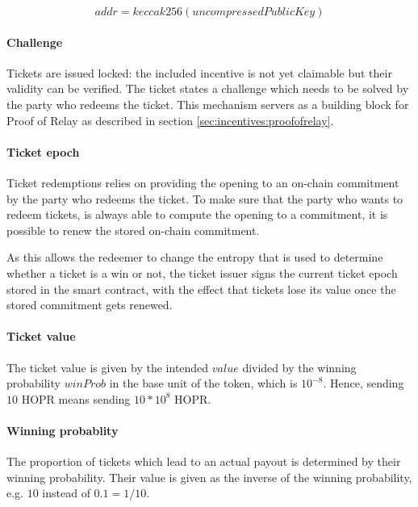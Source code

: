 $$ addr = keccak256( uncompressedPublicKey)$$

\paragraph{Challenge}
\label{sec:tickets:issuance:challenge}

Tickets are issued locked: the included incentive is not yet claimable but their validity can be verified. The ticket states a challenge which needs to be solved by the party who redeems the ticket. This mechanism servers as a building block for Proof of Relay as described in section \ref{sec:incentives:proofofrelay}.

\paragraph{Ticket epoch}
\label{sec:tickets:issuance:ticketepoch}

Ticket redemptions relies on providing the opening to an on-chain commitment by the party who redeems the ticket. To make sure that the party who wants to redeem tickets, is always able to compute the opening to a commitment, it is possible to renew the stored on-chain commitment.

As this allows the redeemer to change the entropy that is used to determine whether a ticket is a win or not, the ticket issuer signs the current ticket epoch stored in the smart contract, with the effect that tickets lose its value once the stored commitment gets renewed.

\paragraph{Ticket value}
\label{sec:tickets:issuance:ticketvalue}

The ticket value is given by the intended $value$ divided by the winning probability $winProb$ in the base unit of the token, which is $10^{-8}$. Hence, sending $10$ HOPR means sending $10 * 10^8$ HOPR.

\paragraph{Winning probablity}
\label{sec:tickets:issuance:winningprobability}

The proportion of tickets which lead to an actual payout is determined by their winning probability. Their value is given as the inverse of the winning probability, e.g. $10$ instead of $0.1 = 1/10$.

